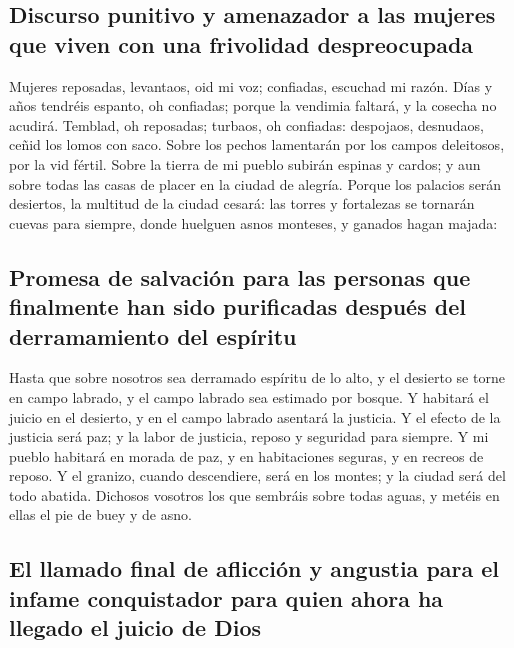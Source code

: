 \hypertarget{discurso-punitivo-y-amenazador-a-las-mujeres-que-viven-con-una-frivolidad-despreocupada}{%
\subsection{Discurso punitivo y amenazador a las mujeres que viven con
una frivolidad
despreocupada}\label{discurso-punitivo-y-amenazador-a-las-mujeres-que-viven-con-una-frivolidad-despreocupada}}

 Mujeres reposadas, levantaos, oid mi voz; confiadas,
escuchad mi razón.  Días y años tendréis espanto, oh
confiadas; porque la vendimia faltará, y la cosecha no acudirá.
 Temblad, oh reposadas; turbaos, oh confiadas: despojaos,
desnudaos, ceñid los lomos con saco.  Sobre los pechos
lamentarán por los campos deleitosos, por la vid fértil. 
Sobre la tierra de mi pueblo subirán espinas y cardos; y aun sobre todas
las casas de placer en la ciudad de alegría.  Porque los
palacios serán desiertos, la multitud de la ciudad cesará: las torres y
fortalezas se tornarán cuevas para siempre, donde huelguen asnos
monteses, y ganados hagan majada:

\hypertarget{promesa-de-salvaciuxf3n-para-las-personas-que-finalmente-han-sido-purificadas-despuuxe9s-del-derramamiento-del-espuxedritu}{%
\subsection{Promesa de salvación para las personas que finalmente han
sido purificadas después del derramamiento del
espíritu}\label{promesa-de-salvaciuxf3n-para-las-personas-que-finalmente-han-sido-purificadas-despuuxe9s-del-derramamiento-del-espuxedritu}}

 Hasta que sobre nosotros sea derramado espíritu de lo
alto, y el desierto se torne en campo labrado, y el campo labrado sea
estimado por bosque.  Y habitará el juicio en el desierto,
y en el campo labrado asentará la justicia.  Y el efecto de
la justicia será paz; y la labor de justicia, reposo y seguridad para
siempre.  Y mi pueblo habitará en morada de paz, y en
habitaciones seguras, y en recreos de reposo.  Y el
granizo, cuando descendiere, será en los montes; y la ciudad será del
todo abatida.  Dichosos vosotros los que sembráis sobre
todas aguas, y metéis en ellas el pie de buey y de asno.

\hypertarget{el-llamado-final-de-aflicciuxf3n-y-angustia-para-el-infame-conquistador-para-quien-ahora-ha-llegado-el-juicio-de-dios}{%
\subsection{El llamado final de aflicción y angustia para el infame
conquistador para quien ahora ha llegado el juicio de
Dios}\label{el-llamado-final-de-aflicciuxf3n-y-angustia-para-el-infame-conquistador-para-quien-ahora-ha-llegado-el-juicio-de-dios}}

